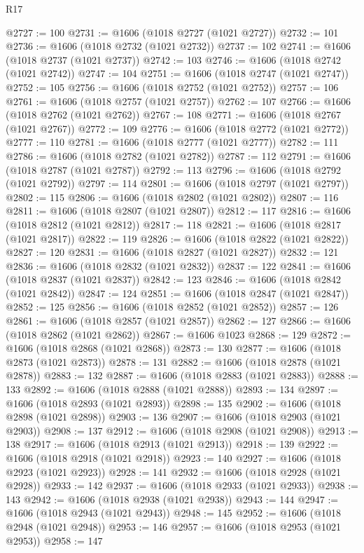 \begin{lexlean}{R17}
\begin{coremodule}
@2727 := 100
@2731 := @1606 (@1018 @2727 (@1021 @2727))
@2732 := 101
@2736 := @1606 (@1018 @2732 (@1021 @2732))
@2737 := 102
@2741 := @1606 (@1018 @2737 (@1021 @2737))
@2742 := 103
@2746 := @1606 (@1018 @2742 (@1021 @2742))
@2747 := 104
@2751 := @1606 (@1018 @2747 (@1021 @2747))
@2752 := 105
@2756 := @1606 (@1018 @2752 (@1021 @2752))
@2757 := 106
@2761 := @1606 (@1018 @2757 (@1021 @2757))
@2762 := 107
@2766 := @1606 (@1018 @2762 (@1021 @2762))
@2767 := 108
@2771 := @1606 (@1018 @2767 (@1021 @2767))
@2772 := 109
@2776 := @1606 (@1018 @2772 (@1021 @2772))
@2777 := 110
@2781 := @1606 (@1018 @2777 (@1021 @2777))
@2782 := 111
@2786 := @1606 (@1018 @2782 (@1021 @2782))
@2787 := 112
@2791 := @1606 (@1018 @2787 (@1021 @2787))
@2792 := 113
@2796 := @1606 (@1018 @2792 (@1021 @2792))
@2797 := 114
@2801 := @1606 (@1018 @2797 (@1021 @2797))
@2802 := 115
@2806 := @1606 (@1018 @2802 (@1021 @2802))
@2807 := 116
@2811 := @1606 (@1018 @2807 (@1021 @2807))
@2812 := 117
@2816 := @1606 (@1018 @2812 (@1021 @2812))
@2817 := 118
@2821 := @1606 (@1018 @2817 (@1021 @2817))
@2822 := 119
@2826 := @1606 (@1018 @2822 (@1021 @2822))
@2827 := 120
@2831 := @1606 (@1018 @2827 (@1021 @2827))
@2832 := 121
@2836 := @1606 (@1018 @2832 (@1021 @2832))
@2837 := 122
@2841 := @1606 (@1018 @2837 (@1021 @2837))
@2842 := 123
@2846 := @1606 (@1018 @2842 (@1021 @2842))
@2847 := 124
@2851 := @1606 (@1018 @2847 (@1021 @2847))
@2852 := 125
@2856 := @1606 (@1018 @2852 (@1021 @2852))
@2857 := 126
@2861 := @1606 (@1018 @2857 (@1021 @2857))
@2862 := 127
@2866 := @1606 (@1018 @2862 (@1021 @2862))
@2867 := @1606 @1023
@2868 := 129
@2872 := @1606 (@1018 @2868 (@1021 @2868))
@2873 := 130
@2877 := @1606 (@1018 @2873 (@1021 @2873))
@2878 := 131
@2882 := @1606 (@1018 @2878 (@1021 @2878))
@2883 := 132
@2887 := @1606 (@1018 @2883 (@1021 @2883))
@2888 := 133
@2892 := @1606 (@1018 @2888 (@1021 @2888))
@2893 := 134
@2897 := @1606 (@1018 @2893 (@1021 @2893))
@2898 := 135
@2902 := @1606 (@1018 @2898 (@1021 @2898))
@2903 := 136
@2907 := @1606 (@1018 @2903 (@1021 @2903))
@2908 := 137
@2912 := @1606 (@1018 @2908 (@1021 @2908))
@2913 := 138
@2917 := @1606 (@1018 @2913 (@1021 @2913))
@2918 := 139
@2922 := @1606 (@1018 @2918 (@1021 @2918))
@2923 := 140
@2927 := @1606 (@1018 @2923 (@1021 @2923))
@2928 := 141
@2932 := @1606 (@1018 @2928 (@1021 @2928))
@2933 := 142
@2937 := @1606 (@1018 @2933 (@1021 @2933))
@2938 := 143
@2942 := @1606 (@1018 @2938 (@1021 @2938))
@2943 := 144
@2947 := @1606 (@1018 @2943 (@1021 @2943))
@2948 := 145
@2952 := @1606 (@1018 @2948 (@1021 @2948))
@2953 := 146
@2957 := @1606 (@1018 @2953 (@1021 @2953))
@2958 := 147

\end{coremodule}
\end{lexlean}
